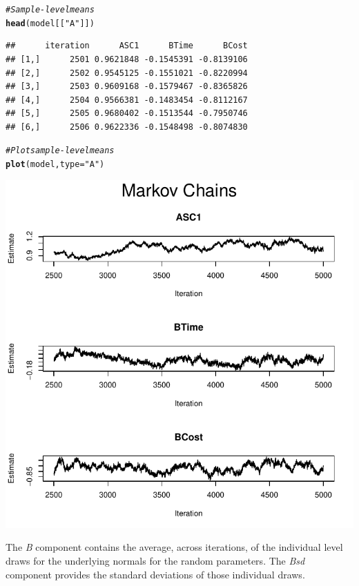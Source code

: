 \documentclass{article}\usepackage[]{graphicx}\usepackage[]{color}
\makeatletter
\def\maxwidth{ %
  \ifdim\Gin@nat@width>\linewidth
    \linewidth
  \else
    \Gin@nat@width
  \fi
}
\newcommand{\hlstr}[1]{\textcolor[rgb]{0.192,0.494,0.8}{#1}}%
\newcommand{\hlcom}[1]{\textcolor[rgb]{0.678,0.584,0.686}{\textit{#1}}}%
\newcommand{\hlstd}[1]{\textcolor[rgb]{0.345,0.345,0.345}{#1}}%
\newcommand{\hlkwc}[1]{\textcolor[rgb]{0.333,0.667,0.333}{#1}}%
\newcommand{\hlkwd}[1]{\textcolor[rgb]{0.737,0.353,0.396}{\textbf{#1}}}%
\newenvironment{kframe}{%
 \def\at@end@of@kframe{}%
 \ifinner\ifhmode%
  \def\at@end@of@kframe{\end{minipage}}%
  \begin{minipage}{\columnwidth}%
 \fi\fi%
 \def\FrameCommand##1{\hskip\@totalleftmargin \hskip-\fboxsep
 \colorbox{shadecolor}{##1}\hskip-\fboxsep
     \hskip-\linewidth \hskip-\@totalleftmargin \hskip\columnwidth}%
 \MakeFramed {\advance\hsize-\width
   \@totalleftmargin\z@ \linewidth\hsize
   \@setminipage}}%
 {\par\unskip\endMakeFramed%
 \at@end@of@kframe}
\newenvironment{knitrout}{}{} %
\makeatother
\begin{document}
\begin{knitrout}
\color{fgcolor}\begin{kframe}
\begin{alltt}
\hlcom{# Sample-level means}
\hlkwd{head}\hlstd{(model[[}\hlstr{"A"}\hlstd{]])}
\end{alltt}
\begin{verbatim}
##      iteration      ASC1      BTime      BCost
## [1,]      2501 0.9621848 -0.1545391 -0.8139106
## [2,]      2502 0.9545125 -0.1551021 -0.8220994
## [3,]      2503 0.9609168 -0.1579467 -0.8365826
## [4,]      2504 0.9566381 -0.1483454 -0.8112167
## [5,]      2505 0.9680402 -0.1513544 -0.7950746
## [6,]      2506 0.9622336 -0.1548498 -0.8074830
\end{verbatim}
\begin{alltt}
\hlcom{# Plot sample-level means}
\hlkwd{plot}\hlstd{(model,} \hlkwc{type} \hlstd{=} \hlstr{"A"}\hlstd{)}
\end{alltt}
\end{kframe}
\includegraphics[width=\maxwidth]{figure/unnamed-chunk-12-1} 

\end{knitrout}

The \emph{B} component contains the average, across iterations, of the individual level draws for the underlying normals for the random parameters. The \emph{Bsd} component provides the standard deviations of those individual draws.
\end{document}
